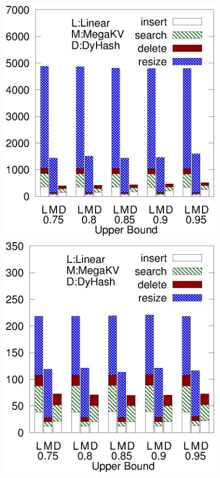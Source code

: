 \begin{figure}[h]
\begin{minipage}{0.18\linewidth}
		\centerline{\dsreddit}
	\end{minipage}
	\hfill
	\begin{minipage}{0.18\linewidth}\centering
		\includegraphics[width=\linewidth]{pic/dynamic/tpch/diff_upper.eps}
		\centerline{\dstpch}
	\end{minipage}
	\hfill
	\begin{minipage}{0.18\linewidth}\centering
		\includegraphics[width=\linewidth]{pic/dynamic/ali/diff_upper.eps}

\end{minipage}
\end{figure}
